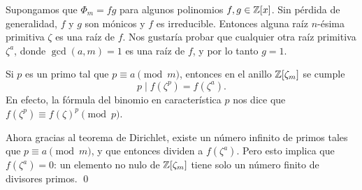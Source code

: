 Supongamos que $\Phi_m = fg$ para algunos polinomios $f,g \in \mathbb{Z}[x]$.
Sin pérdida de generalidad, $f$ y $g$ son mónicos y $f$ es irreducible. Entonces
alguna raíz $n$-ésima primitiva $\zeta$ es una raíz de $f$. Nos gustaría
probar que cualquier otra raíz primitiva $\zeta^a$, donde $\gcd (a,m) = 1$ es
una raíz de $f$, y por lo tanto $g = 1$.

Si $p$ es un primo tal que $p \equiv a \pmod{m}$, entonces en el anillo
$\mathbb{Z} [\zeta_m]$ se cumple
$$p \mid f (\zeta^p) = f (\zeta^a).$$
En efecto, la fórmula del binomio en característica $p$ nos dice que
$f (\zeta^p) \equiv f (\zeta)^p \pmod{p}$.

Ahora gracias al teorema de Dirichlet, existe un número infinito de primos tales
que $p \equiv a \pmod{m}$, y que entonces dividen a $f (\zeta^a)$. Pero
esto implica que $f (\zeta^a) = 0$: un elemento no nulo de $\mathbb{Z} [\zeta_m]$ tiene
solo un número finito de divisores primos. \qed
